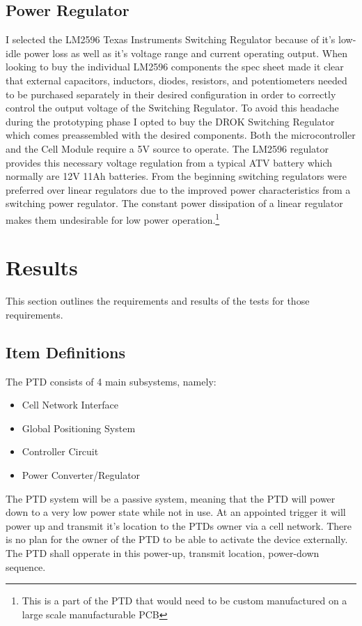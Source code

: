 \documentclass[11pt]{article}
\begin{document}
\subsection{Power Regulator}
I selected the LM2596 Texas Instruments Switching Regulator because of it's low-idle power loss as well as it's voltage range and current operating output. When looking
to buy the individual LM2596 components the spec sheet made it clear that external capacitors, inductors, diodes, resistors, and potentiometers needed to be purchased separately
in their desired configuration in order to correctly control the output voltage of the Switching Regulator. To avoid this headache during the prototyping phase I opted
to buy the DROK Switching Regulator which comes preassembled with the desired components. Both the microcontroller and the Cell Module require a 5V source to operate.
The LM2596 regulator provides this necessary voltage regulation from a typical ATV battery which normally are 12V 11Ah batteries. From the beginning switching regulators were
preferred over linear regulators due to the improved power characteristics from a switching power regulator. The constant power dissipation of a linear regulator makes them 
undesirable for low power operation.\footnote{This is a part of the PTD that would need to be custom manufactured on a large scale manufacturable PCB}   


\section{Results}
This section outlines the requirements and results of the tests for those requirements.

\subsection{Item Definitions}
The PTD consists of 4 main subsystems, namely:
\begin{itemize}
    \item Cell Network Interface
    \item Global Positioning System
    \item Controller Circuit
    \item Power Converter/Regulator
\end{itemize}
The PTD system will be a passive system, meaning that the PTD will power down to a very low power state while not in use. At an appointed 
trigger it will power up and transmit it's location to the PTDs owner via a cell network. There is no plan for the owner of the PTD to be able to 
activate the device externally. The PTD shall opperate in this power-up, transmit location, power-down sequence.
\end{document}
